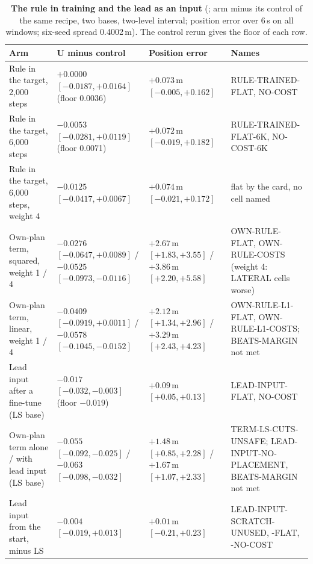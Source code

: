 \begin{table}[!tp]
\centering
\caption{\textbf{The rule in training and the lead as an input} (; arm minus its control of the same recipe, two bases, two-level interval; position error over 6\,s on all windows; six-seed spread 0.4002\,m). The control rerun gives the floor of each row.}
\label{tab:ruletrain}
\scriptsize
\begin{tabularx}{\textwidth}{@{}>{\raggedright\arraybackslash}p{40mm}>{\raggedright\arraybackslash}X>{\raggedright\arraybackslash}X>{\raggedright\arraybackslash}X@{}}
\toprule
Arm & U minus control & Position error & Names \\
\midrule
Rule in the target, 2,000 steps & $+0.0000$ $[-0.0187,+0.0164]$ (floor 0.0036) & $+0.073$\,m $[-0.005,+0.162]$ & RULE-TRAINED-FLAT, NO-COST \\
Rule in the target, 6,000 steps & $-0.0053$ $[-0.0281,+0.0119]$ (floor 0.0071) & $+0.072$\,m $[-0.019,+0.182]$ & RULE-TRAINED-FLAT-6K, NO-COST-6K \\
Rule in the target, 6,000 steps, weight 4 & $-0.0125$ $[-0.0417,+0.0067]$ & $+0.074$\,m $[-0.021,+0.172]$ & flat by the card, no cell named \\
Own-plan term, squared, weight 1 / 4 & $-0.0276$ $[-0.0647,+0.0089]$ / $-0.0525$ $[-0.0973,-0.0116]$ & $+2.67$\,m $[+1.83,+3.55]$ / $+3.86$\,m $[+2.20,+5.58]$ & OWN-RULE-FLAT, OWN-RULE-COSTS (weight 4: LATERAL cells worse) \\
Own-plan term, linear, weight 1 / 4 & $-0.0409$ $[-0.0919,+0.0011]$ / $-0.0578$ $[-0.1045,-0.0152]$ & $+2.12$\,m $[+1.34,+2.96]$ / $+3.29$\,m $[+2.43,+4.23]$ & OWN-RULE-L1-FLAT, OWN-RULE-L1-COSTS; BEATS-MARGIN not met \\
Lead input after a fine-tune (LS base) & $-0.017$ $[-0.032,-0.003]$ (floor $-0.019$) & $+0.09$\,m $[+0.05,+0.13]$ & LEAD-INPUT-FLAT, NO-COST \\
Own-plan term alone / with lead input (LS base) & $-0.055$ $[-0.092,-0.025]$ / $-0.063$ $[-0.098,-0.032]$ & $+1.48$\,m $[+0.85,+2.28]$ / $+1.67$\,m $[+1.07,+2.33]$ & TERM-LS-CUTS-UNSAFE; LEAD-INPUT-NO-PLACEMENT, BEATS-MARGIN not met \\
Lead input from the start, minus LS & $-0.004$ $[-0.019,+0.013]$ & $+0.01$\,m $[-0.21,+0.23]$ & LEAD-INPUT-SCRATCH-UNUSED, -FLAT, -NO-COST \\
\bottomrule
\end{tabularx}
\end{table}

